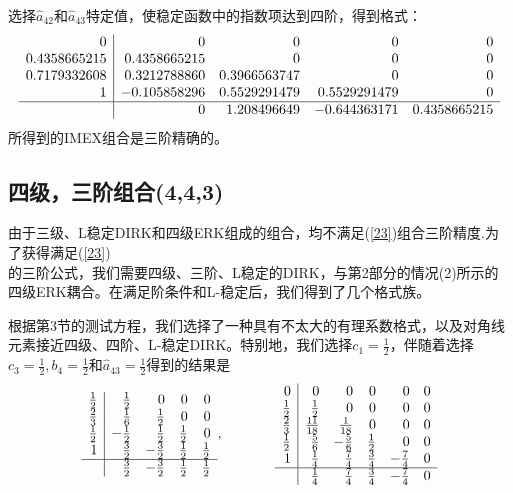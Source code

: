 \documentclass[12pt,a4paper]{article}
\begin{document}
选择$\widehat{a}_{42}$和$\widehat{a}_{43}$特定值，使稳定函数中的指数项达到四阶，得到格式：
\[
\begin{array}{r|rrrr}
0 & 0 & 0 & 0 & 0 \\
0.4358665215 & 0.4358665215 & 0 &  0 & 0\\
0.7179332608 & 0.3212788860 & 0.3966563747 & 0 & 0\\
1 & -0.105858296 & 0.5529291479 & 0.5529291479 & 0\\
\hline
& 0 & 1.208496649 & -0.644363171 & 0.4358665215
\end{array}
\]
所得到的IMEX组合是三阶精确的。

\subsection{四级，三阶组合(4,4,3)}

由于三级、L稳定DIRK和四级ERK组成的组合，均不满足(\ref{23})组合三阶精度.为了获得满足(\ref{23})\\的三阶公式，我们需要四级、三阶、L稳定的DIRK，与第2部分的情况(2)所示的四级ERK耦合。在满足阶条件和L-稳定后，我们得到了几个格式族。

根据第3节的测试方程，我们选择了一种具有不太大的有理系数格式，以及对角线元素接近四级、四阶、L-稳定DIRK。特别地，我们选择$c_{1}=\frac{1}{2}$，伴随着选择$c_{3}=\frac{1}{2},b_{4}=\frac{1}{2}$和$\widehat{a}_{43}=\frac{1}{2}$得到的结果是
\[
\begin{array}{r|rrrr}
\frac{1}{2} & \frac{1}{2} & 0 & 0 & 0\\
\frac{2}{3} & \frac{1}{6} & \frac{1}{2} & 0 & 0 \\
\frac{1}{2} & -\frac{1}{2} & \frac{1}{2} & \frac{1}{2} & 0 \\
1 & \frac{3}{2} & -\frac{3}{2} & \frac{1}{2} & \frac{1}{2} \\
\hline
& \frac{3}{2} & -\frac{3}{2} & \frac{1}{2} & \frac{1}{2} 
\end{array},~~~~~~~~~~~
\begin{array}{r|rrrrr}
0 & 0 & 0 & 0 & 0 & 0 \\
\frac{1}{2} & \frac{1}{2} & 0 & 0 & 0 & 0\\
\frac{2}{3} & \frac{11}{18} & \frac{1}{18} & 0 & 0 & 0\\
\frac{1}{2} & \frac{5}{6} & -\frac{5}{6} & \frac{1}{2} & 0 & 0\\
1 & \frac{1}{4} & \frac{7}{4} & \frac{3}{4} & -\frac{7}{4} & 0\\
\hline
& \frac{1}{4} & \frac{7}{4} & \frac{3}{4} & -\frac{7}{4} & 0
\end{array}
\]
\end{document}
